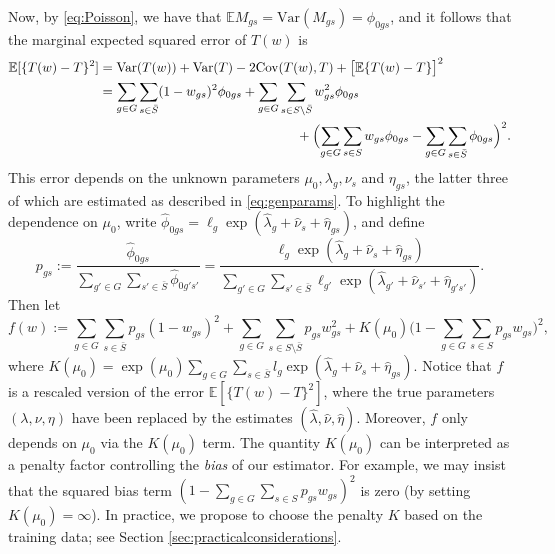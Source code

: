 \documentclass[10pt,twoside,openright]{report}
\newcommand{\var}{\mathrm{Var}}
\begin{document}
Now, by \eqref{eq:Poisson}, we have that $\mathbb{E}M_{gs} = \var(M_{gs}) = \phi_{0gs}$, and it follows that the marginal expected squared error of $T(w)$ is
\begin{align}
\label{eq:MSE}
\mathbb{E}[\{T(w) - T\}^2] & = \mathrm{Var}(T(w)) + \mathrm{Var}(T) - 2\mathrm{Cov}(T(w), T) + \bigl[\mathbb{E}\{T(w) - T\}\bigr]^2  \nonumber \\
& = \sum_{g \in G} \sum_{s \in \bar{S}}(1- w_{gs})^2\phi_{0gs} + \sum_{g \in G} \sum_{s \in S \setminus \bar{S}}w_{gs}^2\phi_{0gs}  \nonumber \\ & \hspace{150pt} + \Bigl(\sum_{g \in G}\sum_{s \in S}w_{gs}\phi_{0gs}
- \sum_{g \in G} \sum_{s \in \bar{S}}\phi_{0gs} \Bigr)^2.
\end{align} 
This error depends on the unknown parameters $\mu_0, \lambda_g, \nu_s$ and $\eta_{gs}$, the latter three of which are estimated as described in \eqref{eq:genparams}. 
To highlight the dependence on $\mu_0$, write $\hat{\phi}_{0gs} = \ell_g\exp(\hat{\lambda}_g + \hat{\nu}_s + \hat{\eta}_{gs})$, and define
\[
p_{gs}  := \frac{\hat{\phi}_{0gs}}{\sum_{g' \in G} \sum_{s' \in \bar{S}} \hat{\phi}_{0g's'}} = \frac{\ell_g \exp(\hat{\lambda}_g + \hat{\nu}_s + \hat{\eta}_{gs})}{\sum_{g'\in G} \sum_{s'\in \bar{S}} \ell_{g'} \exp(\hat{\lambda}_{g'} + \hat{\nu}_{s'} + \hat{\eta}_{g's'})}.
\]
Then let
\[
f(w) := \sum_{g \in G}\sum_{s \in \bar{S}} p_{gs}(1-w_{gs})^2  + \sum_{g \in G}\sum_{ s\in S \setminus \bar{S}}p_{gs} w_{gs}^2 + K(\mu_0)\big( 1 - \sum_{g \in G}\sum_{s \in S}  p_{gs}w_{gs} \big)^2,
\]
where $K(\mu_0) = \exp(\mu_0)\sum_{g \in G}\sum_{s \in \bar{S}}l_{g}\exp(\hat{\lambda}_g + \hat{\nu}_s + \hat{\eta}_{gs})$. Notice that $f$ is a rescaled version of the error  $\mathbb{E}[\{T(w)-T\}^2]$, where the true parameters $(\lambda, \nu, \eta)$ have been replaced by the estimates $(\hat{\lambda}, \hat{\nu}, \hat{\eta})$. Moreover, $f$ only depends on $\mu_0$ via the $K(\mu_0)$ term. The quantity $K(\mu_0)$ can be interpreted as a penalty factor controlling the \emph{bias} of our estimator. For example, we may insist that the squared bias term $(1 - \sum_{g \in G}\sum_{s \in S}  p_{gs}w_{gs})^2$ is zero (by setting $K(\mu_0) = \infty$). In practice, we propose to choose the penalty $K$ based on the training data; see Section \ref{sec:practicalconsiderations}. 
\end{document}
